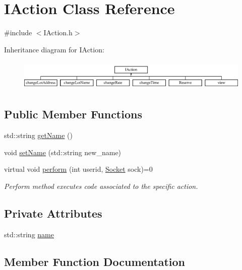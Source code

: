 \hypertarget{class_i_action}{}\section{I\+Action Class Reference}
\label{class_i_action}


{\ttfamily \#include $<$I\+Action.\+h$>$}

Inheritance diagram for I\+Action\+:\begin{figure}[H]
\begin{center}
\leavevmode
\includegraphics[height=1.481482cm]{class_i_action}
\end{center}
\end{figure}
\subsection*{Public Member Functions}
\begin{DoxyCompactItemize}
\item 
std\+::string \mbox{\hyperlink{class_i_action_af3af290dcc0798a04628f2a35fe5e803}{get\+Name}} ()
\item 
void \mbox{\hyperlink{class_i_action_a4a38fa06fac69702e53abd46c2e7ae9e}{set\+Name}} (std\+::string new\+\_\+name)
\item 
virtual void \mbox{\hyperlink{class_i_action_abaaa72a5af9c0169cb5b793292a5d18f}{perform}} (int userid, \mbox{\hyperlink{class_socket}{Socket}} sock)=0
\begin{DoxyCompactList}\small\item\em Perform method executes code associated to the specific action. \end{DoxyCompactList}\end{DoxyCompactItemize}
\subsection*{Private Attributes}
\begin{DoxyCompactItemize}
\item 
std\+::string \mbox{\hyperlink{class_i_action_a384f5aba23093f729d03136abcf9d168}{name}}
\end{DoxyCompactItemize}


\subsection{Member Function Documentation}
\mbox{\label{class_i_action_af3af290dcc0798a04628f2a35fe5e803}} 
